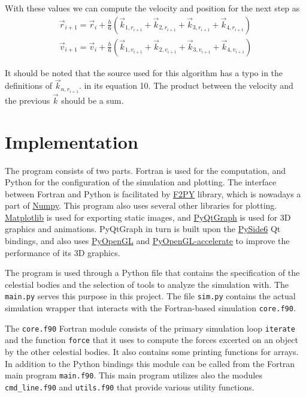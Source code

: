 \documentclass[a4paper]{article}
\begin{document}
With these values we can compute the velocity and position for the next step as
\begin{align}
\vec{r}_{i+1} = \vec{r}_i + \frac{h}{6} \left( \vec{k}_{1,r_{i+1}} + \vec{k}_{2,r_{i+1}} + \vec{k}_{3,r_{i+1}} + \vec{k}_{4,r_{i+1}} \right) \\
\vec{v}_{i+1} = \vec{v}_i + \frac{h}{6} \left( \vec{k}_{1,v_{i+1}} + \vec{k}_{2,v_{i+1}} + \vec{k}_{3,v_{i+1}} + \vec{k}_{4,v_{i+1}} \right)
\end{align}

It should be noted that the source used for this algorithm has a typo in the definitions of $\vec{k}_{n,r_{i+1}}$. in its equation 10.
The product between the velocity and the previous $\vec{k}$ should be a sum.
\cite{voesenek_implementing_2008}




\clearpage
\section{Implementation}
The program consists of two parts.
Fortran is used for the computation, and Python for the configuration of the simulation and plotting.
The interface between Fortran and Python is facilitated by
\href{https://numpy.org/doc/stable/f2py/}{F2PY} library, which is nowadays a part of
\href{https://numpy.org/}{Numpy}.
This program also uses several other libraries for plotting.
\href{https://matplotlib.org/}{Matplotlib} is used for exporting static images, and 
\href{https://www.pyqtgraph.org/}{PyQtGraph} is used for 3D graphics and animations.
PyQtGraph in turn is built upon the
\href{https://pypi.org/project/PySide6/}{PySide6} Qt bindings,
and also uses
\href{https://pypi.org/project/PyOpenGL/}{PyOpenGL} and
\href{https://pypi.org/project/PyOpenGL-accelerate/}{PyOpenGL-accelerate} to improve the performance of its 3D graphics.

The program is used through a Python file that contains the specification of the celestial bodies and the selection of tools to analyze the simulation with.
The \texttt{main.py} serves this purpose in this project.
The file \texttt{sim.py} contains the actual simulation wrapper that interacts with the Fortran-based simulation \texttt{core.f90}.

The \texttt{core.f90} Fortran module consists of the primary simulation loop \linebreak \texttt{iterate} and the function \texttt{force} that it uses to compute the forces excerted on an object by the other celestial bodies.
It also contains some printing functions for arrays.
In addition to the Python bindings this module can be called from the Fortran main program \texttt{main.f90}.
This main program utilizes also the modules \texttt{cmd\_line.f90} and \texttt{utils.f90} that provide various utility functions.
\end{document}
